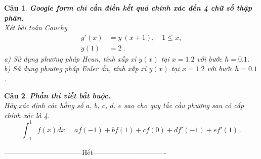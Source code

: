 \documentclass[11pt]{article}
\newtheorem{bt}{Câu}
\begin{document}
\begin{bt} \textbf{Google form chỉ cần điền kết quả chính xác đến 4 chữ số thập phân.} \\
Xét bài toán Cauchy  
\begin{align}
	y'(x) &= y \ (x+1), \quad 1 \leq x, \\
	y(1)  &= 2 \ . 
\end{align}
%
a) Sử dụng phương pháp Heun, tính xấp xỉ $y(x)$ tại $x=1.2$ với bước $h = 0.1$. \\
b) Sử dụng phương pháp Euler ẩn, tính xấp xỉ $y(x)$ tại $x=1.2$ với bước $h = 0.1$. \\	
\end{bt}

\begin{bt} \textbf{Phần thi viết bắt buộc.} \\ 
	Hãy xác định các hằng số $a$, $b$, $c$, $d$, $e$ sao cho quy tắc cầu phương sau có cấp chính xác là 4.
	\[  \int_{-1}^{1} f(x) dx = a f(-1) + bf (1) + cf(0) + d f'(-1) + e f'(1) \ .  \]
\end{bt}

\centerline{———————————Hết——————————-}
\end{document}
